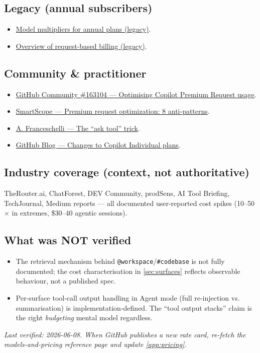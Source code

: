 \documentclass[11pt,a4paper]{article}
\begin{document}
\subsection*{Legacy (annual subscribers)}
\begin{itemize}
  \item \href{https://docs.github.com/en/copilot/reference/copilot-billing/model-multipliers-for-annual-plans}{Model multipliers for annual plans (legacy)}.
  \item \href{https://docs.github.com/en/billing/concepts/product-billing/github-copilot-premium-requests}{Overview of request-based billing (legacy)}.
\end{itemize}

\subsection*{Community \& practitioner}
\begin{itemize}
  \item \href{https://github.com/orgs/community/discussions/163104}{GitHub Community \#163104 --- Optimising Copilot Premium Request usage}.
  \item \href{https://smartscope.blog/en/generative-ai/github-copilot/github-copilot-premium-request-optimization/}{SmartScope --- Premium request optimization: 8 anti-patterns}.
  \item \href{https://alessio.franceschelli.me/posts/ai/stop-wasting-premium-requests-in-github-copilot/}{A. Franceschelli --- The ``ask tool'' trick}.
  \item \href{https://github.blog/news-insights/company-news/changes-to-github-copilot-individual-plans/}{GitHub Blog --- Changes to Copilot Individual plans}.
\end{itemize}

\subsection*{Industry coverage (context, not authoritative)}
TheRouter.ai, ChatForest, DEV Community, prodSens, AI Tool Briefing, TechJournal, Medium reports --- all documented user-reported cost spikes (10--50$\times$ in extremes, \$30--40 agentic sessions).

\subsection*{What was NOT verified}
\begin{itemize}
  \item The retrieval mechanism behind \texttt{@workspace}/\texttt{\#codebase} is not fully documented; the cost characterisation in \cref{sec:surfaces} reflects observable behaviour, not a published spec.
  \item Per-surface tool-call output handling in Agent mode (full re-injection vs. summarisation) is implementation-defined. The ``tool output stacks'' claim is the right \emph{budgeting} mental model regardless.
\end{itemize}

\vspace{2em}
\noindent\emph{Last verified: 2026-06-08. When GitHub publishes a new rate card, re-fetch the models-and-pricing reference page and update \cref{app:pricing}.}
\end{document}
